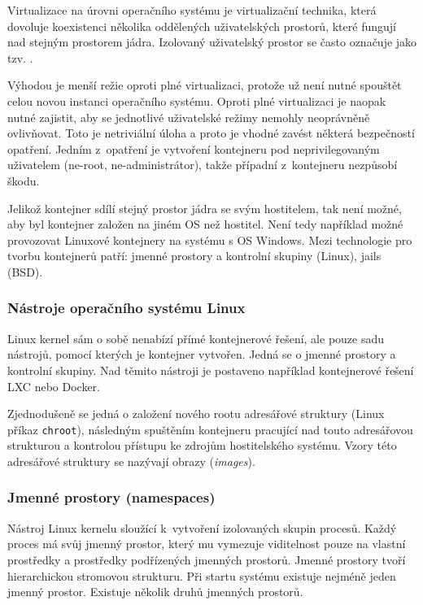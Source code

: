 
Virtualizace na úrovni operačního systému je virtualizační technika, která dovoluje koexistenci několika oddělených uživatelských prostorů, které fungují nad stejným prostorem jádra.
Izolovaný uživatelský prostor se často označuje jako tzv. .

Výhodou je menší režie oproti plné virtualizaci, protože už není nutné spouštět celou novou instanci operačního systému.
Oproti plné virtualizaci je naopak nutné zajistit, aby se jednotlivé uživatelské režimy nemohly neoprávněně ovlivňovat.
Toto je netriviální úloha a proto je vhodné zavést některá bezpečností opatření.
Jedním z~opatření je vytvoření kontejneru pod neprivilegovaným uživatelem (ne-root, ne-administrátor), takže případní  z~kontejneru nezpůsobí škodu.

Jelikož kontejner sdílí stejný prostor jádra se svým hostitelem, tak není možné, aby byl kontejner založen na jiném OS než hostitel.
Není tedy například možné provozovat Linuxové kontejnery na systému s OS Windows.
Mezi technologie pro tvorbu kontejnerů patří: jmenné prostory a kontrolní skupiny (Linux), jails (BSD).

\subsubsection{Nástroje operačního systému Linux}

Linux kernel sám o sobě nenabízí přímé kontejnerové řešení, ale pouze sadu nástrojů, pomocí kterých je kontejner vytvořen.
Jedná se o jmenné prostory a kontrolní skupiny.
Nad těmito nástroji je postaveno například kontejnerové řešení LXC nebo Docker.

Zjednodušeně se jedná o založení nového rootu adresářové struktury (Linux příkaz \verb|chroot|), následným spuštěním kontejneru pracující nad touto adresářovou strukturou a kontrolou přístupu ke zdrojům hostitelského systému.
Vzory této adresářové struktury se nazývají obrazy (\textit{images}).

\subsubsection{Jmenné prostory (namespaces)}

Nástroj Linux kernelu sloužící k~vytvoření izolovaných skupin procesů.
Každý proces má svůj jmenný prostor, který mu vymezuje viditelnost pouze na vlastní prostředky a prostředky podřízených jmenných prostorů.
Jmenné prostory tvoří hierarchickou stromovou strukturu.
Při startu systému existuje nejméně jeden jmenný prostor.
Existuje několik druhů jmenných prostorů.

